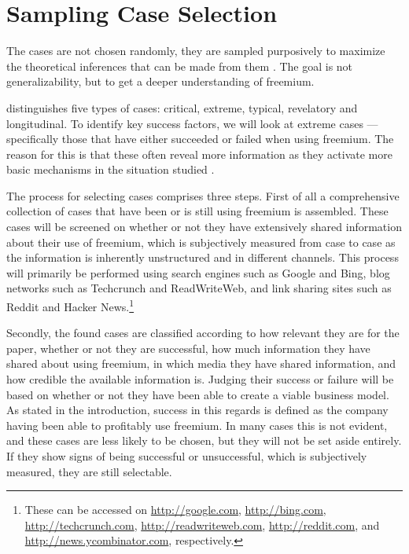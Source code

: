 \section{Sampling \oldand Case Selection}

The cases are not chosen randomly, they are sampled purposively to maximize the theoretical inferences that can be made from them \citep{eisenhardt1989,flyvbjerg2004}. The goal is not generalizability, but to get a deeper understanding of freemium.


\citet{bryman2008} distinguishes five types of cases: critical, extreme, typical, revelatory and longitudinal. To identify key success factors, we will look at extreme cases --- specifically those that have either succeeded or failed when using freemium. The reason for this is that these often reveal more information as they activate more basic mechanisms in the situation studied \citep{flyvbjerg2004}. 

The process for selecting cases comprises three steps. First of all a comprehensive collection of cases that have been or is still using freemium is assembled. These cases will be screened on whether or not they have extensively shared information about their use of freemium, which is subjectively measured from case to case as the information is inherently unstructured and in different channels. This process will primarily be performed using search engines such as Google and Bing, blog networks such as Techcrunch and ReadWriteWeb, and link sharing sites such as Reddit and Hacker News.\footnote{These can be accessed on \url{http://google.com}, \url{http://bing.com}, \url{http://techcrunch.com}, \url{http://readwriteweb.com}, \url{http://reddit.com}, and \url{http://news.ycombinator.com}, respectively.}

Secondly, the found cases are classified according to how relevant they are for the paper, \ie whether or not they are successful, how much information they have shared about using freemium, in which media they have shared information, and how credible the available information is. Judging their success or failure will be based on whether or not they have been able to create a viable business model. As stated in the introduction, success in this regards is defined as the company having been able to profitably use freemium. In many cases this is not evident, and these cases are less likely to be chosen, but they will not be set aside entirely. If they show signs of being successful or unsuccessful, which is subjectively measured, they are still selectable.

